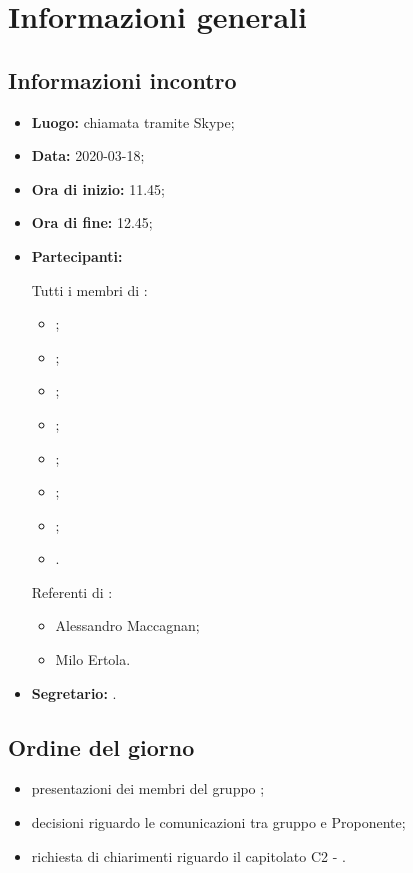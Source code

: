 \section{Informazioni generali}
\subsection{Informazioni incontro}
\begin{itemize}
	\item \textbf{Luogo:} chiamata tramite Skype;
	\item \textbf{Data:} 2020-03-18;
	\item \textbf{Ora di inizio:} 11.45;
	\item \textbf{Ora di fine:} 12.45;
	\item \textbf{Partecipanti:}
		
		Tutti i membri di \Gruppo:
		\begin{itemize}
			\item \VB;
			\item \LB;
			\item \NF;
			\item \EG;
			\item \FJ;
			\item \MP;
			\item \AS;
			\item \AZ.
		\end{itemize}
		
		Referenti di \Proponente{}:
		\begin{itemize}
			\item Alessandro Maccagnan;
			\item Milo Ertola.
		\end{itemize}
	\item \textbf{Segretario:} \VB.
\end{itemize}

\subsection{Ordine del giorno}
\begin{itemize}
	\item presentazioni dei membri del gruppo \Gruppo;
	\item decisioni riguardo le comunicazioni tra gruppo e Proponente;
	\item richiesta di chiarimenti riguardo il capitolato C2 - \NomeProgetto.
\end{itemize}

